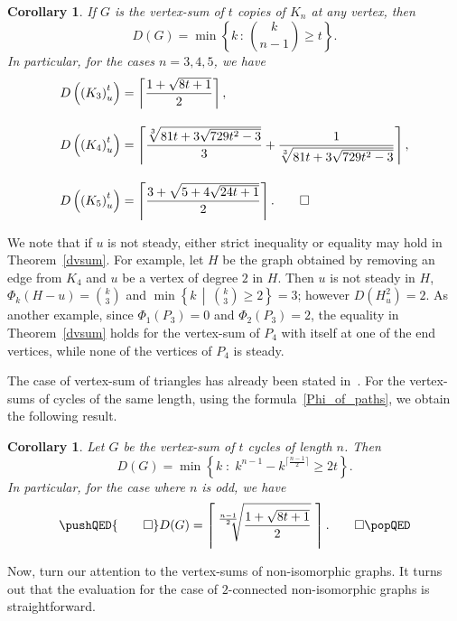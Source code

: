 \documentclass[12pt,a4paper, longbibliography]{article}
\newtheorem{corollary}[theorem]{{\color{THM}Corollary}}
\theoremstyle{definition}
\numberwithin{equation}{section}
\begin{document}
	\begin{corollary}\label{vsum_of_K_n}
		If $G$ is the vertex-sum of  $t$ copies of $K_n$ at any vertex, then
		\[
		D(G) = \min \left\{    k  \,  :  \, {k \choose n-1}\geq t  \right\}.
	 \]
		In particular, for the cases $n=3,4,5$, we have
		\begin{align*}
		D\left( {(K_3)}_u^t\right) &= \left\lceil{\frac{1+\sqrt{8t+1}}{2}}\right\rceil,\\[10pt]
		D\left( {(K_4)}_u^t\right) &= \left\lceil \frac{\sqrt[3]{81t+3\sqrt{729t^2-3}}}{3}    +   \frac{1}{\sqrt[3]{81t+3\sqrt{729t^2-3}}}\right\rceil,\\[10pt]
        D\left( {(K_5)}_u^t\right) &= \left\lceil    \frac{3   + \sqrt{5+4\sqrt{24t+1}}}{2}\right\rceil.\qed
	\end{align*}
	\end{corollary}
	
	
	
	
	We note that if  $u$ is not steady, either strict inequality or equality may hold in Theorem~\ref{dvsum}. For example, let $H$ be the graph obtained by removing an edge from $K_4$ and $u$ be a vertex of degree $2$ in $H$. Then $u$ is not steady in $H$,  $\Phi_k(H-u)={k\choose 3}$ 	and $\min\left\{k \,\middle\vert\, {k\choose 3} \geq 2\right\} = 3$; however $D(H_u^2)=2$. 
	As another example, since $\Phi_1(P_3)=0 $ and $\Phi_2(P_3)=2$, the equality in Theorem~\ref{dvsum} holds for the vertex-sum of $P_4$ with itself at one of the end vertices, while none of the  vertices of $P_4$ is steady.  	
	
	
	
	
	The case of vertex-sum of triangles has already been stated in~\cite{alikhani2016distinguishing}. For  the vertex-sums of cycles of the same length, using the formula~\ref{Phi_of_paths}, we obtain the following result.
	
	\begin{corollary}\label{vsum_cycles_same_length}
		Let $G$ be the vertex-sum of $t$ cycles of length $n$. Then
		\[D(G) = \min \left\{ k  \; : \;   k^{n-1} - k^{\lceil \frac{n-1}{2} \rceil} \geq 2t  \right\}.\] 
		In particular, for the case where $n$ is  odd, we have 	
		\[\pushQED{\qed}
		D(G) =\left\lceil{\sqrt[\frac{n-1}{2}]{\frac{1 + \sqrt{8t+1}}{2}}}\,\,\right\rceil.\qedhere\popQED\] 
	\end{corollary}
	
	
	
	Now, turn our attention to the  vertex-sums of non-isomorphic graphs. It turns out that the evaluation for the case of  $2$-connected non-isomorphic graphs is straightforward.
	
\end{document}

